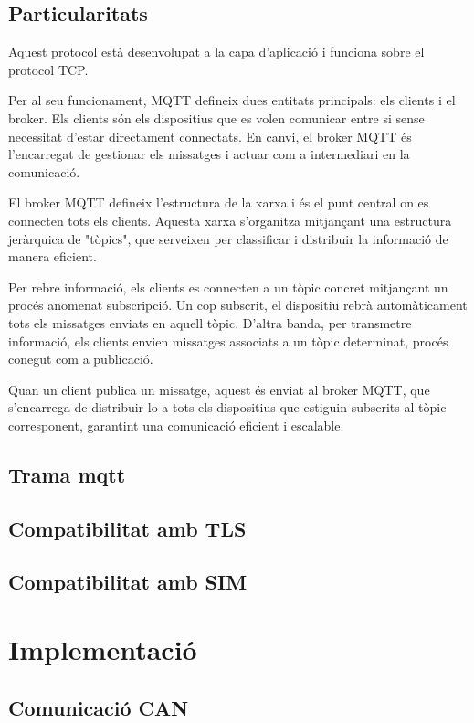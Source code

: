 \documentclass{tfgitic}[2024/07/01]
\begin{document}
\section{Particularitats}

Aquest protocol està desenvolupat a la capa d'aplicació i funciona sobre el protocol TCP.

Per al seu funcionament, MQTT defineix dues entitats principals: els clients i el broker. Els clients són els 
dispositius que es volen comunicar entre si sense necessitat d'estar directament connectats. En canvi, el broker 
MQTT és l'encarregat de gestionar els missatges i actuar com a intermediari en la comunicació.

El broker MQTT defineix l'estructura de la xarxa i és el punt central on es connecten tots els clients. Aquesta
xarxa s'organitza mitjançant una estructura jeràrquica de "tòpics", que serveixen per classificar i distribuir la 
informació de manera eficient.

Per rebre informació, els clients es connecten a un tòpic concret mitjançant un procés anomenat subscripció. 
Un cop subscrit, el dispositiu rebrà automàticament tots els missatges enviats en aquell tòpic. D'altra banda, 
per transmetre informació, els clients envien missatges associats a un tòpic determinat, procés conegut com a 
publicació.

Quan un client publica un missatge, aquest és enviat al broker MQTT, que s'encarrega de distribuir-lo a tots 
els dispositius que estiguin subscrits al tòpic corresponent, garantint una comunicació eficient i escalable.


\section{Trama mqtt}

\section{Compatibilitat amb TLS}

\section{Compatibilitat amb SIM}

\chapter{Implementació}

\section{Comunicació CAN}
\end{document}
